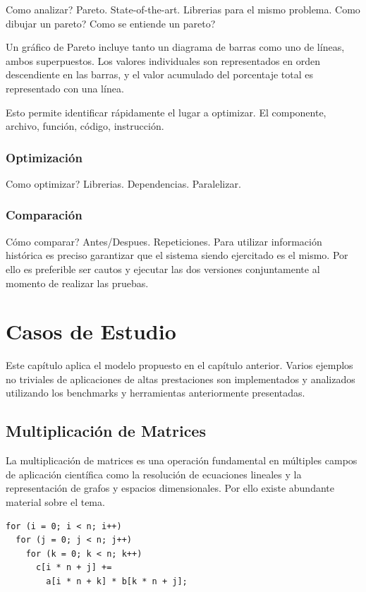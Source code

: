 \documentclass[a4paper]{report}
\begin{document}
Como analizar? Pareto. State-of-the-art. Librerias para el mismo problema.
Como dibujar un pareto? Como se entiende un pareto?

Un gr\'afico de Pareto incluye tanto un diagrama de barras como uno de l\'ineas, ambos superpuestos.
Los valores individuales son representados en orden descendiente en las barras, y el valor acumulado del porcentaje total es representado con una l\'inea.

Esto permite identificar r\'apidamente el lugar a optimizar. El componente, archivo, funci\'on, c\'odigo, instrucci\'on.

\subsection{Optimizaci\'on}

Como optimizar? Librerias. Dependencias. Paralelizar.

\subsection{Comparaci\'on}

C\'omo comparar? Antes/Despues. Repeticiones. Para utilizar informaci\'on
hist\'orica es preciso garantizar que el sistema siendo ejercitado es el mismo. Por ello es preferible ser cautos y ejecutar las dos versiones conjuntamente
al momento de realizar las pruebas. 

\chapter{Casos de Estudio}

Este cap\'itulo aplica el modelo propuesto en el cap\'itulo anterior. Varios ejemplos no triviales de aplicaciones de altas prestaciones son implementados
y analizados utilizando los benchmarks y herramientas anteriormente presentadas.

\section{Multiplicaci\'on de Matrices}

La multiplicaci\'on de matrices es una operaci\'on fundamental en m\'ultiples
campos de aplicaci\'on cient\'ifica como la resoluci\'on de ecuaciones
lineales y la representaci\'on de grafos y espacios dimensionales. Por ello
existe abundante material sobre el tema.

\begin{verbatim}
for (i = 0; i < n; i++)
  for (j = 0; j < n; j++)
    for (k = 0; k < n; k++)
      c[i * n + j] += 
        a[i * n + k] * b[k * n + j];
\end{verbatim}
\end{document}
